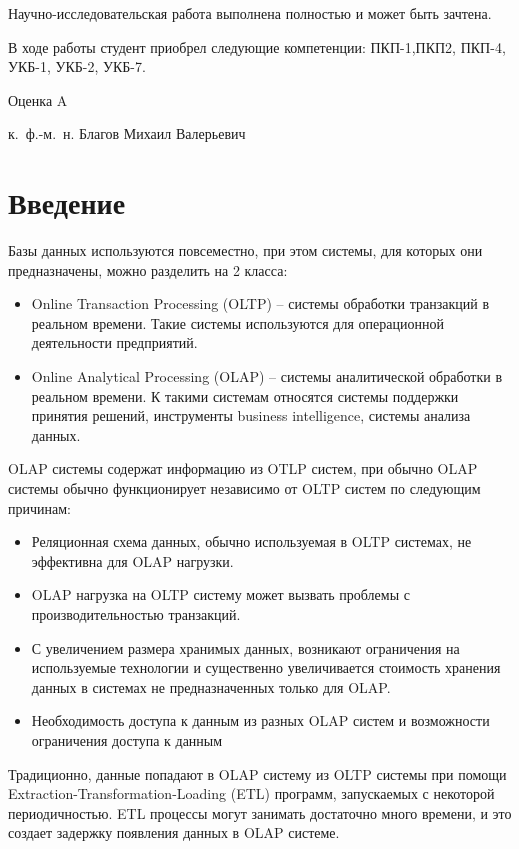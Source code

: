 \documentclass[%
bachelor,    %
subf,        %
href,        %
colorlinks,  %
]{disser}
\begin{document}
Научно-исследовательская работа выполнена полностью и может быть зачтена.

В ходе работы студент приобрел следующие компетенции: ПКП-1,ПКП2, ПКП-4, УКБ-1, УКБ-2, УКБ-7.

Оценка A
\begin{flushright}
к.~ф.-м.~н. Благов Михаил Валерьевич
\end{flushright}

\tableofcontents


\section{Введение}
  
Базы данных используются повсеместно, при этом системы, для которых они предназначены, можно разделить на 2 класса:\cite{oltp_olap_2}
\begin{itemize}
\item Online Transaction Processing (OLTP) -- системы обработки транзакций в реальном времени. Такие системы используются для операционной деятельности предприятий.
\item Online Analytical Processing (OLAP) -- системы аналитической обработки в реальном времени. К такими системам относятся системы поддержки принятия решений, инструменты business intelligence, системы анализа данных.
\end{itemize}

OLAP системы содержат информацию из OTLP систем, при обычно OLAP системы обычно функционирует независимо от OLTP систем по следующим причинам:\cite{oltp_olap}
\begin{itemize}
	\item Реляционная схема данных, обычно используемая в OLTP системах, не эффективна для OLAP нагрузки.
	\item OLAP нагрузка на OLTP систему может вызвать проблемы с производительностью транзакций.
	\item С увеличением размера хранимых данных, возникают ограничения на используемые технологии и существенно увеличивается стоимость хранения данных в системах не предназначенных только для OLAP.
	\item Необходимость доступа к данным из разных OLAP систем и возможности ограничения доступа к данным
\end{itemize}

Традиционно, данные попадают в OLAP систему из OLTP системы при помощи Extraction-Transformation-Loading (ETL) программ,
запускаемых с некоторой периодичностью. ETL процессы могут занимать достаточно много времени, и это создает задержку появления данных в OLAP системе. 
\end{document}
